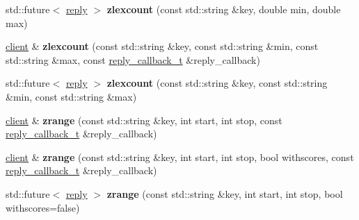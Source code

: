 \begin{DoxyCompactItemize}
\item 
\mbox{\label{classcpp__redis_1_1client_ab492b901c49f913d0120b87afee9458c}} 
std\+::future$<$ \hyperlink{classcpp__redis_1_1reply}{reply} $>$ {\bfseries zlexcount} (const std\+::string \&key, double min, double max)
\item 
\mbox{\label{classcpp__redis_1_1client_a90bd86c8348ca8bfec29d66d9e5bdfc3}} 
\hyperlink{classcpp__redis_1_1client}{client} \& {\bfseries zlexcount} (const std\+::string \&key, const std\+::string \&min, const std\+::string \&max, const \hyperlink{classcpp__redis_1_1client_a061a1140d36d2eaeda82b09a0bb3f9f2}{reply\+\_\+callback\+\_\+t} \&reply\+\_\+callback)
\item 
\mbox{\label{classcpp__redis_1_1client_ace7bbf92a0ea2cac775e5bc66a0d1ea8}} 
std\+::future$<$ \hyperlink{classcpp__redis_1_1reply}{reply} $>$ {\bfseries zlexcount} (const std\+::string \&key, const std\+::string \&min, const std\+::string \&max)
\item 
\mbox{\label{classcpp__redis_1_1client_a70025f24f20e81397868467651c804a9}} 
\hyperlink{classcpp__redis_1_1client}{client} \& {\bfseries zrange} (const std\+::string \&key, int start, int stop, const \hyperlink{classcpp__redis_1_1client_a061a1140d36d2eaeda82b09a0bb3f9f2}{reply\+\_\+callback\+\_\+t} \&reply\+\_\+callback)
\item 
\mbox{\label{classcpp__redis_1_1client_a7a86805d2495c3866df9095ea71ab842}} 
\hyperlink{classcpp__redis_1_1client}{client} \& {\bfseries zrange} (const std\+::string \&key, int start, int stop, bool withscores, const \hyperlink{classcpp__redis_1_1client_a061a1140d36d2eaeda82b09a0bb3f9f2}{reply\+\_\+callback\+\_\+t} \&reply\+\_\+callback)
\item 
\mbox{\label{classcpp__redis_1_1client_a75f0e330b851c7bfcf373a7ef9f30cb8}} 
std\+::future$<$ \hyperlink{classcpp__redis_1_1reply}{reply} $>$ {\bfseries zrange} (const std\+::string \&key, int start, int stop, bool withscores=false)
\item 
\mbox{\label{classcpp__redis_1_1client_a24f15cede24bdb482167b1ea00db3160}} 

\end{DoxyCompactItemize}
